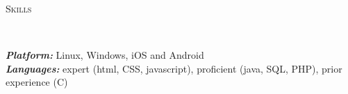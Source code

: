 \documentclass[3pt]{article}
\newenvironment{changemargin}[2]{%
  \begin{list}{}{%
    \setlength{\topsep}{0pt}%
    \setlength{\leftmargin}{#1}%
    \setlength{\rightmargin}{#2}%
    \setlength{\listparindent}{\parindent}%
    \setlength{\itemindent}{\parindent}%
    \setlength{\parsep}{\parskip}%
  }%
  \item[]}{\end{list}
}
\newcommand{\lineover}{
	\begin{changemargin}{-0.05in}{-0.05in}
		\vspace*{-8pt}
		\hrulefill \\
		\vspace*{-2pt}
	\end{changemargin}
}
\newcommand{\header}[1]{
	\begin{changemargin}{-0.5in}{-0.5in}
		{\Large \scshape{#1}}\\
  	\lineover
	\end{changemargin}
}
\newenvironment{body} {
	\vspace*{-16pt}
	\begin{changemargin}{-0.25in}{-0.5in}
  }	
	{\end{changemargin}
}
\begin{document}

\header{Skills}

\begin{body}
	\vspace{18pt}
    \emph{\textbf{Platform:}}{} Linux, Windows, iOS and Android\\
	\emph{\textbf{Languages:}}{} expert (html, CSS, javascript), proficient (java, SQL, PHP), prior experience (C) \\
\end{body}

\smallskip
\end{document}
